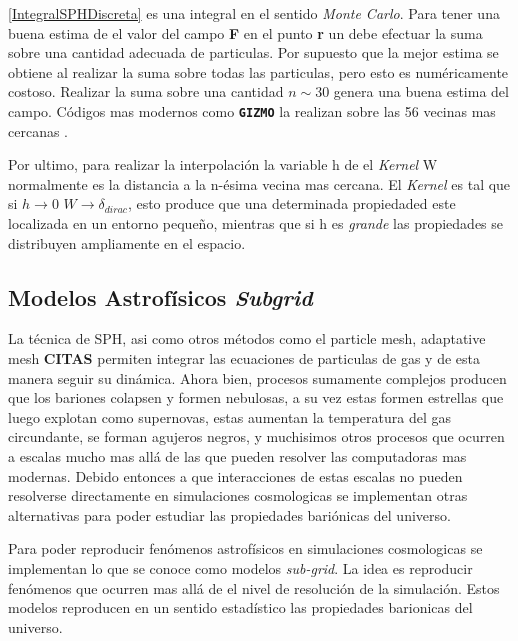 \ref{IntegralSPHDiscreta} es una integral en el sentido \textit{Monte Carlo}. Para tener una buena estima de el valor del campo \textbf{F} en el punto \textbf{r} un debe efectuar la suma sobre una cantidad adecuada de particulas. Por supuesto que la mejor estima se obtiene al realizar la suma sobre todas las particulas, pero esto es num\'ericamente costoso. Realizar la suma sobre una cantidad $n\sim30$ genera una buena estima del campo. C\'odigos mas modernos como \texttt{\textbf{GIZMO}} la realizan sobre las 56 vecinas mas cercanas \citep{GIZMO2015}.

Por ultimo, para realizar la interpolaci\'on la variable h de el \textit{Kernel} W normalmente es la distancia a la n-\'esima vecina mas cercana. El \textit{Kernel} es tal que si $h\rightarrow 0$ $W \rightarrow \delta_{dirac}$, esto produce que una determinada propiedaded este localizada en un entorno peque\~no, mientras que si h es \textit{grande} las propiedades se distribuyen ampliamente en el espacio. 

\subsection{Modelos Astrof\'isicos \textit{Subgrid}}

La t\'ecnica de SPH, asi como otros m\'etodos como el particle mesh, adaptative mesh \textbf{CITAS} permiten integrar las ecuaciones de particulas de gas y de esta manera seguir su din\'amica. Ahora bien, procesos sumamente complejos producen que los bariones colapsen y formen nebulosas, a su vez estas formen estrellas que luego explotan como supernovas, estas aumentan la temperatura del gas circundante, se forman agujeros negros, y muchisimos otros procesos que ocurren a escalas mucho mas all\'a de las que pueden resolver las computadoras mas modernas. Debido entonces a que interacciones de estas escalas no pueden resolverse directamente en simulaciones cosmologicas se implementan otras alternativas para poder estudiar las propiedades bari\'onicas del universo.

Para poder reproducir fen\'omenos astrof\'isicos en simulaciones cosmologicas se implementan lo que se conoce como modelos \textit{sub-grid}. La idea es reproducir fen\'omenos que ocurren mas all\'a de el nivel de resoluci\'on de la simulaci\'on. Estos modelos reproducen en un sentido estad\'istico las propiedades barionicas del universo. 

